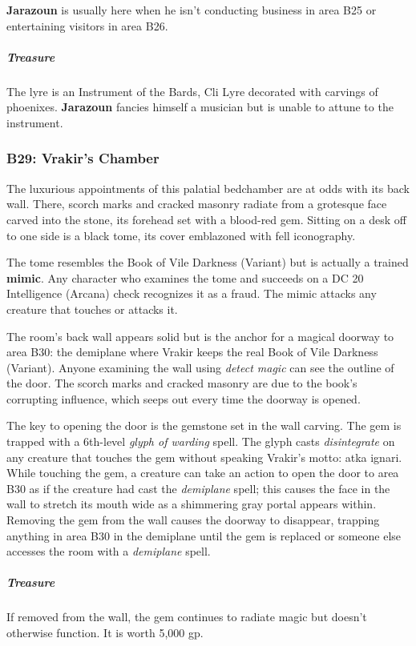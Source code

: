 \documentclass[10pt,a4paper,twoside,bg=print,twocolumn,openany,nodeprecatedcode]{dndbook}
\begin{document}
\textbf{Jarazoun} is usually here when he isn't conducting business in area B25 or entertaining visitors in area B26.

\subparagraph{Treasure}
The lyre is an Instrument of the Bards, Cli Lyre decorated with carvings of phoenixes. \textbf{Jarazoun} fancies himself a musician but is unable to attune to the instrument.

\subsubsection{B29: Vrakir's Chamber}
\begin{DndReadAloud}{}
The luxurious appointments of this palatial bedchamber are at odds with its back wall. There, scorch marks and cracked masonry radiate from a grotesque face carved into the stone, its forehead set with a blood-red gem. Sitting on a desk off to one side is a black tome, its cover emblazoned with fell iconography.

\end{DndReadAloud}

The tome resembles the Book of Vile Darkness (Variant) but is actually a trained \textbf{mimic}. Any character who examines the tome and succeeds on a DC 20 Intelligence (Arcana) check recognizes it as a fraud. The mimic attacks any creature that touches or attacks it.

The room's back wall appears solid but is the anchor for a magical doorway to area B30: the demiplane where Vrakir keeps the real Book of Vile Darkness (Variant). Anyone examining the wall using \textit{detect magic} can see the outline of the door. The scorch marks and cracked masonry are due to the book's corrupting influence, which seeps out every time the doorway is opened.

The key to opening the door is the gemstone set in the wall carving. The gem is trapped with a 6th-level \textit{glyph of warding} spell. The glyph casts \textit{disintegrate} on any creature that touches the gem without speaking Vrakir's motto: atka ignari. While touching the gem, a creature can take an action to open the door to area B30 as if the creature had cast the \textit{demiplane} spell; this causes the face in the wall to stretch its mouth wide as a shimmering gray portal appears within. Removing the gem from the wall causes the doorway to disappear, trapping anything in area B30 in the demiplane until the gem is replaced or someone else accesses the room with a \textit{demiplane} spell.

\subparagraph{Treasure}
If removed from the wall, the gem continues to radiate magic but doesn't otherwise function. It is worth 5,000 gp.
\end{document}
